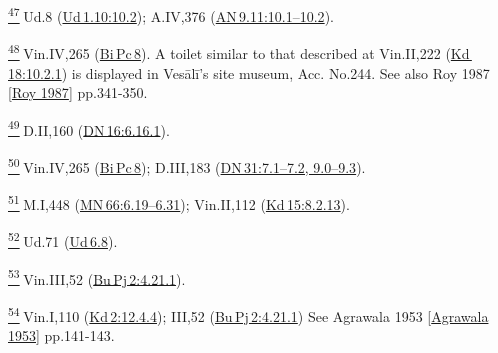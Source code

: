 \label{footprints_split_024.html_fn47}
\hyperref[footprints_split_006.htmlux5cux23fnref47]{\textsuperscript{47}} Ud.8
(\href{https://suttacentral.net/ud1.10/en/sujato\#10.2}{Ud\,1.10:10.2});
A.IV,376
(\href{https://suttacentral.net/an9.11/en/sujato\#10.1}{AN\,9.11:10.1--10.2}).

\label{footprints_split_024.html_fn48}
\hyperref[footprints_split_006.htmlux5cux23fnref48]{\textsuperscript{48}} Vin.IV,265
(\href{https://suttacentral.net/pli-tv-bi-vb-pc8/en/brahmali}{Bi\,Pc\,8}).
A toilet similar to that described at Vin.II,222
(\href{https://suttacentral.net/pli-tv-kd18/en/brahmali\#10.2.1}{Kd\,18:10.2.1})
is displayed in Vesālī's site museum, Acc. No.244. See also {Roy 1987
{{[}\hyperref[footprints_split_022.htmlux5cux23Royux5cux25201987]{Roy
1987}{]}}} pp.341-350.

\label{footprints_split_024.html_fn49}
\hyperref[footprints_split_006.htmlux5cux23fnref49]{\textsuperscript{49}} D.II,160
(\href{https://suttacentral.net/dn16/en/sujato\#6.16.1}{DN\,16:6.16.1}).

\label{footprints_split_024.html_fn50}
\hyperref[footprints_split_006.htmlux5cux23fnref50]{\textsuperscript{50}} Vin.IV,265
(\href{https://suttacentral.net/pli-tv-bi-vb-pc8/en/brahmali}{Bi\,Pc\,8});
D.III,183
(\href{https://suttacentral.net/dn31/en/sujato\#7.1}{DN\,31:7.1--7.2,
9.0--9.3}).

\label{footprints_split_024.html_fn51}
\hyperref[footprints_split_006.htmlux5cux23fnref51]{\textsuperscript{51}} M.I,448
(\href{https://suttacentral.net/mn66/en/sujato\#6.19}{MN\,66:6.19--6.31});
Vin.II,112
(\href{https://suttacentral.net/pli-tv-kd15/en/brahmali\#8.2.18}{Kd\,15:8.2.13}).

\label{footprints_split_024.html_fn52}
\hyperref[footprints_split_006.htmlux5cux23fnref52]{\textsuperscript{52}} Ud.71
(\href{https://suttacentral.net/ud6.8/en/sujato}{Ud\,6.8}).

\label{footprints_split_024.html_fn53}
\hyperref[footprints_split_006.htmlux5cux23fnref53]{\textsuperscript{53}} Vin.III,52
(\href{https://suttacentral.net/pli-tv-bu-vb-pj2/en/brahmali\#4.21.1}{Bu\,Pj\,2:4.21.1}).

\label{footprints_split_024.html_fn54}
\hyperref[footprints_split_006.htmlux5cux23fnref54]{\textsuperscript{54}} Vin.I,110
(\href{https://suttacentral.net/pli-tv-kd2/en/brahmali\#12.4.4}{Kd\,2:12.4.4});
III,52
(\href{https://suttacentral.net/pli-tv-bu-vb-pj2/en/brahmali\#4.21.1}{Bu\,Pj\,2:4.21.1})
See {Agrawala 1953
{{[}\hyperref[footprints_split_022.htmlux5cux23Agrawalaux5cux25201953]{Agrawala
1953}{]}}} pp.141-143.

